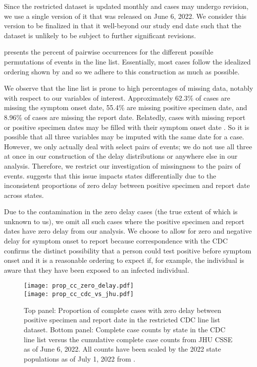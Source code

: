 Since the restricted dataset is updated
monthly and cases may undergo revision, we use a single version of it that was
released on June 6, 2022. We consider this version to be finalized in that it
well-beyond our study end date such that the dataset is unlikely to be subject
to further significant revisions.

 presents the percent of pairwise occurrences
for the different possible permutations of events in the line list. Essentially,
most cases follow the idealized ordering shown by
 and so we adhere to this construction as
much as possible.

We observe that the line list is prone to high percentages of missing data,
notably with respect to our variables of interest. Approximately 62.3\% of cases
are missing the symptom onset date, 55.4\% are missing positive specimen date,
and 8.96\% of cases are missing the report date. Relatedly,
cases with
missing report or positive specimen dates may be filled with their symptom onset date
\citep{jahja2022real}. So it is possible that all three variables may be
imputed with the same date for a case. However, we only actually deal with
select pairs of events; we do not use all three at once in our construction of
the delay distributions or anywhere else in our analysis. Therefore, we restrict
our investigation of missingness to the pairs of events.
 suggests that this issue impacts states
differentially due to the inconsistent proportions of zero delay between
positive specimen and report date across states. 

Due to the contamination in the zero delay cases (the true extent of which is
unknown to us), we omit all such cases where the positive specimen and report
dates have zero delay from our analysis. We choose to allow for zero and
negative delay for symptom onset to report because correspondence with the CDC
confirms the distinct possibility that a person could test positive before
symptom onset and it is a reasonable ordering to expect if, for example, the
individual is aware that they have been exposed to an infected individual.

\begin{figure}[!tb]
\centering
\texttt{[image: prop\_cc\_zero\_delay.pdf]}\\
\texttt{[image: prop\_cc\_cdc\_vs\_jhu.pdf]} 
\caption{Top panel: Proportion of complete cases with zero delay between
    positive specimen and report date in the restricted CDC line list dataset.
    Bottom panel: Complete case counts by state in the CDC line list versus the
    cumulative complete case counts from JHU CSSE as of June 6, 2022. All
    counts have been scaled by the 2022 state populations as of July 1, 2022
    from \citep{uscensus2022annual}.}
\label{fig:prop-cc}
\end{figure}


